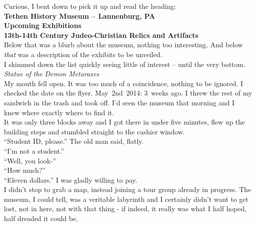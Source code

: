 \documentclass[a5paper]{scrartcl}
\begin{document}
Curious, I bent down to pick it up and read the heading:\\


\textbf{Tethen History Museum -- Lannenburg, PA}
\\


\textbf{Upcoming Exhibitions}
\\


\textbf{13th-14th Century Judeo-Christian Relics and Artifacts}
\\


Below that was a blurb about the museum, nothing too interesting. And below \textit{that}
 was a description of the exhibits to be unveiled.\\


I skimmed down the list quickly seeing little of interest -- until the very bottom.\\


\textit{Statue of the Demon Metaraxes}
\\


My mouth fell open. It was too much of a coincidence, nothing to be ignored. I checked the date on the flyer. May~2nd~2014: 3~weeks ago. I threw the rest of my sandwich in the trash and took off. I'd seen the museum that morning and I knew where exactly where to find it.\\


It was only three blocks away and I got there in under five minutes, flew up the building steps and stumbled straight to the cashier window.\\


\enquote{Student ID, please.} The old man said, flatly.\\


\enquote{I'm not a student.}\\


\enquote{Well, you look-}\\


\enquote{How much?}\\


\enquote{Eleven dollars.} I was gladly willing to pay.\\


I didn't stop to grab a map, instead joining a tour group already in progress. The museum, I could tell, was a veritable labyrinth and I certainly didn't want to get lost, not in here, not with that thing - if indeed, it really was what I half hoped, half dreaded it could be.\\
\end{document}
